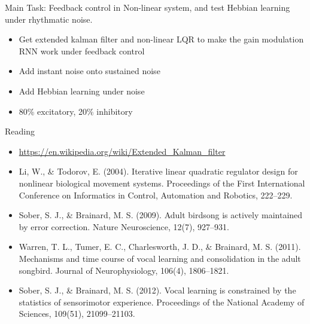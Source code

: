 \documentclass[12pt, a4paper]{article}
\begin{document}
\noindent
Main Task: Feedback control in Non-linear system, and test Hebbian learning under rhythmatic noise.

\begin{itemize}
    \item Get extended kalman filter and non-linear LQR to make the gain modulation RNN work under feedback control
    \item Add instant noise onto sustained noise
    \item Add Hebbian learning under noise
    \item 80\% excitatory, 20\% inhibitory
\end{itemize}

\noindent
Reading

\begin{itemize}
    \item \url{https://en.wikipedia.org/wiki/Extended_Kalman_filter}
    \item Li, W., \& Todorov, E. (2004). Iterative linear quadratic regulator design for nonlinear biological movement systems. Proceedings of the First International Conference on Informatics in Control, Automation and Robotics, 222–229.
    \item Sober, S. J., \& Brainard, M. S. (2009). Adult birdsong is actively maintained by error correction. Nature Neuroscience, 12(7), 927–931.
    \item Warren, T. L., Tumer, E. C., Charlesworth, J. D., \& Brainard, M. S. (2011). Mechanisms and time course of vocal learning and consolidation in the adult songbird. Journal of Neurophysiology, 106(4), 1806–1821.
    \item Sober, S. J., \& Brainard, M. S. (2012). Vocal learning is constrained by the statistics of sensorimotor experience. Proceedings of the National Academy of Sciences, 109(51), 21099–21103.
\end{itemize}

\newpage
\end{document}
